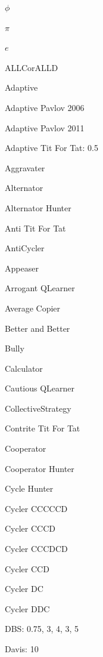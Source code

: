 \item $\phi$~\cite{axelrodproject}
\item $\pi$~\cite{axelrodproject}
\item $e$~\cite{axelrodproject}
\item ALLCorALLD \cite{axelrodproject}
\item Adaptive~\cite{Li2011}
\item Adaptive Pavlov 2006~\cite{kendall2007iterated}
\item Adaptive Pavlov 2011~\cite{Li2011}
\item Adaptive Tit For Tat: 0.5~\cite{Tzafestas2000}
\item Aggravater~\cite{axelrodproject}
\item Alternator~\cite{Axelrod1981, Mittal2009}
\item Alternator Hunter~\cite{axelrodproject}
\item Anti Tit For Tat~\cite{Hilbe2013}
\item AntiCycler~\cite{axelrodproject}
\item Appeaser~\cite{axelrodproject}
\item Arrogant QLearner~\cite{axelrodproject}
\item Average Copier~\cite{axelrodproject}
\item Better and Better~\cite{prison}
\item Bully~\cite{Nachbar1992}
\item Calculator~\cite{prison}
\item Cautious QLearner~\cite{axelrodproject}
\item CollectiveStrategy~\cite{Li2009}
\item Contrite Tit For Tat~\cite{Axelrod1995}
\item Cooperator~\cite{Axelrod1981, Mittal2009, Press2012}
\item Cooperator Hunter~\cite{axelrodproject}
\item Cycle Hunter~\cite{axelrodproject}
\item Cycler CCCCCD~\cite{axelrodproject}
\item Cycler CCCD~\cite{axelrodproject}
\item Cycler CCCDCD~\cite{axelrodproject}
\item Cycler CCD~\cite{Mittal2009}
\item Cycler DC~\cite{axelrodproject}
\item Cycler DDC~\cite{Mittal2009}
\item DBS: 0.75, 3, 4, 3, 5~\cite{Au2006}
\item Davis: 10~\cite{Axelrod1980a}
